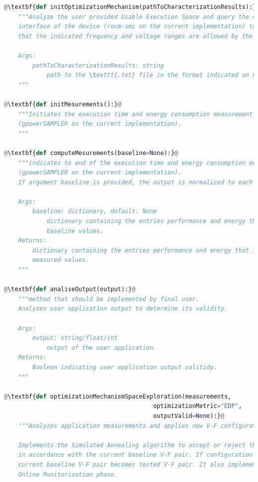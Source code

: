 \begin{lstlisting}[language=Python, caption=Python wrapper documentation., label=lst:wrapper_doc, basicstyle=\footnotesize\ttfamily,abovecaptionskip=0pt, captionpos=b,escapechar=@]
@\textbf{def initOptimizationMechanism(pathToCharacterizationResults):}@
    """Analyze the user provided Usable Execution Space and query the dvfs control 
    interface of the device (rocm-smi on the current implementation) to guarantee 
    that the indicated frequency and voltage ranges are allowed by the target device.
    
    Args:
        pathToCharacterizationResults: string
            path to the \texttt{.txt} file in the format indicated on Figure 4.2.
    """
    
@\textbf{def initMesurements():}@
    """Initiates the execution time and energy consumption measurement 
    (gpowerSAMPLER on the current implementation).
    """

@\textbf{def computeMesurements(baseline=None):}@
    """indicates to end of the execution time and energy consumption measurement 
    (gpowerSAMPLER on the current implementation). 
    If argument baseline is provided, the output is normalized to each baseline value
    
    Args:
        baseline: dictionary, default: None
            dictionary containing the entries performance and energy that indicate the
            baseline values.
    Returns:
        dictionary containing the entries performance and energy that indicate the
        measured values.
    """

@\textbf{def analiseOutput(output):}@
    """method that should be implemented by final user.
    Analyzes user application output to determine its validity.
    
    Args:
        output: string/float/int
            output of the user application.
    Returns:
        Boolean indicating user application output valitidy.
    """
    
@\textbf{def optimizationMechanismSpaceExploration(measurements, 
                                          optimizationMetric="EDP", 
                                          outputValid=None):}@
    """Analyzes application measurements and applies new V-F configuration
    
    Implements the Simulated Annealing algorithm to accept or reject the tested V-F pair
    in accordance with the current baseline V-F pair. If configuration is accepted,
    current baseline V-F pair becomes tested V-F pair. It also implements the 
    Online Monitorization phase.
    

\end{lstlisting}
